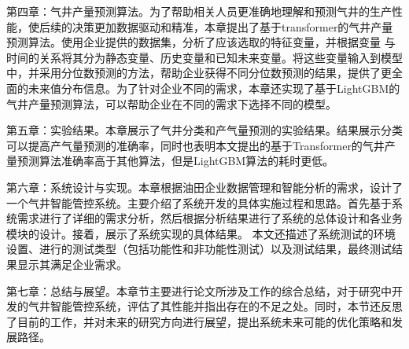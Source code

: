 第四章：气井产量预测算法。为了帮助相关人员更准确地理解和预测气井的生产性能，使后续的决策更加数据驱动和精准，本章提出了基于transformer的气井产量预测算法。使用企业提供的数据集，分析了应该选取的特征变量，并根据变量
与时间的关系将其分为静态变量、历史变量和已知未来变量。将这些变量输入到模型中，并采用分位数预测的方法，帮助企业获得不同分位数预测的结果，提供了更全面的未来值分布信息。为了针对企业不同的需求，本章还实现了基于LightGBM的气井产量预测算法，可以帮助企业在不同的需求下选择不同的模型。

第五章：实验结果。本章展示了气井分类和产气量预测的实验结果。结果展示分类可以提高产气量预测的准确率，同时也表明本文提出的基于Transformer的气井产量预测算法准确率高于其他算法，但是LightGBM算法的耗时更低。

第六章：系统设计与实现。本章根据油田企业数据管理和智能分析的需求，设计了一个气井智能管控系统。主要介绍了系统开发的具体实施过程和思路。首先基于系统需求进行了详细的需求分析，然后根据分析结果进行了系统的总体设计和各业务模块的设计。接着，展示了系统实现的具体结果。
本文还描述了系统测试的环境设置、进行的测试类型（包括功能性和非功能性测试）以及测试结果，最终测试结果显示其满足企业需求。

第七章：总结与展望。本章节主要进行论文所涉及工作的综合总结，对于研究中开发的气井智能管控系统，评估了其性能并指出存在的不足之处。同时，本节还反思了目前的工作，并对未来的研究方向进行展望，提出系统未来可能的优化策略和发展路径。